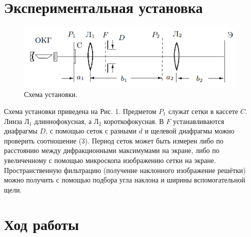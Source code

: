 \documentclass[a4paper,12pt]{article}
\begin{document}
\section*{Экспериментальная установка}
\begin{figure}[h]
\includegraphics[scale=0.7]{1.png}
\centering
\caption{Схема установки.}
\end{figure}
Схема установки приведена на Рис. 1. Предметом $P_1$ служат сетки в кассете $C$. Линза $\text{Л}_1$ длиннофокусная, а $\text{Л}_2$ короткофокусная. В $F$ устанавливаются диафрагмы $D$, с помощью сеток с разными $d$ и щелевой диафрагмы можно проверить соотношение (3). Период сеток может быть измерен либо по расстоянию между дифракционными максимумами на экране, либо по увеличенному с помощью микроскопа изображению сетки на экране. Пространственную фильтрацию (получение наклонного изображение решётки) можно получить с помощью подбора угла наклона и ширины вспомогательной щели.
\newpage
\section*{Ход работы}
\end{document}
